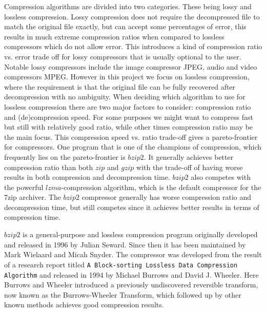 \documentclass{article}
\begin{document}
Compression algorithms are divided into two categories. These being lossy and lossless compression. Lossy compression does not require the decompressed file to match the original file exactly, but can accept some percentages of error, this results in much extreme compression ratios when compared to lossless compressors which do not allow error. This introduces a kind of compression ratio vs. error trade off for lossy compressors that is usually optional to the user.
Notable lossy compressors include the image compressor JPEG\cite{jpeg1}, audio and video compressors MPEG\cite{mpeg1}\cite{mpeg2}. However in this project we focus on lossless compression, where the requirement is that the original file can be fully recovered after decompression with no ambiguity.
When deciding which algorithm to use for lossless compression there are two major factors to consider: compression ratio and (de)compression speed. %
For some purposes we might want to compress fast but still with relatively good ratio, while other times compression ratio may be the main focus. This compression speed vs. ratio trade-off gives a pareto-frontier for compressors.
One program that is one of the champions of compression, which frequently lies on the pareto-frontier is \(bzip2\). It generally achieves better compression ratio than both \(zip\) and \(gzip\) with the trade-off of having worse results in both compression and decompression time.\cite{gzipzipbzip2} \(bzip2\) also competes with the powerful \(lzma\)-compression algorithm, which is the default compressor for the 7zip archiver.\cite{lzmaformat}\cite{ziv1977universal} The \(bzip2\) compressor generally has worse compression ratio and decompression time, but still competes since it achieves better results in terms of compression time.\cite{gzipbzip2lzma}

\(bzip2\) is a general-purpose and lossless compression program originally developed and released in 1996 by Julian Seward. Since then it has been maintained by Mark Wielaard and Micah Snyder. %
The compressor was developed from the result of a research report titled \texttt{A Block-sorting Lossless Data Compression Algorithm} and released in 1994 by Michael Burrows and David J. Wheeler.\cite{bwt1}\cite{manzini1999burrows} Here Burrows and Wheeler introduced a previously undiscovered reversible transform, now known as the Burrows-Wheeler Transform, which followed up by other known methods achieves good compression results.
\end{document}

